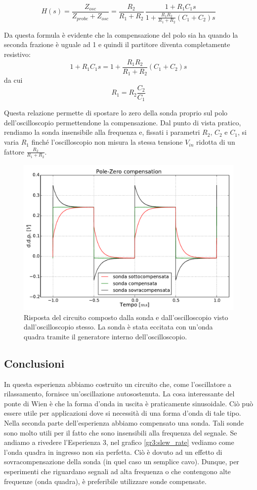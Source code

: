 \begin{equation}
H(s)=\frac{Z_{osc}}{Z_{probe}+Z_{osc}} = \frac{R_2}{R_1+R_2}\,\frac{1+R_1C_1s}{1+\frac{R_1R_2}{R_1+R_2}(C_1+C_2)s}
\end{equation}

Da questa formula è evidente che la compensazione del polo sia ha quando la seconda frazione è uguale ad \num{1} e quindi il partitore diventa completamente resistivo:
\begin{equation*}
1+R_1C_1s = 1+\frac{R_1R_2}{R_1+R_2}(C_1+C_2)s
\end{equation*}
da cui
\begin{equation}
R_1 = R_2 \frac{C_2}{C_1}
\end{equation}

Questa relazione permette di spostare lo zero della sonda proprio sul polo dell'oscilloscopio permettendone la compensazione.
Dal punto di vista pratico, rendiamo la sonda insensibile alla frequenza e, fissati i parametri $R_2$, $C_2$ e $C_1$, si varia $R_1$ finché l'oscilloscopio non misura la stessa tensione $V_{in}$ ridotta di un fattore $\frac{R_2}{R_1+R_2}$.

\begin{figure}[htpc]
\centering
\includegraphics[width=.65\textwidth]{../E08/latex/compensation.pdf}
\caption{Risposta del circuito composto dalla sonda e dall'oscilloscopio visto dall'oscilloscopio stesso. La sonda è stata eccitata con un'onda quadra tramite il generatore interno dell'oscilloscopio.}
\label{fig8:compensation}
\end{figure}

\subsection*{Conclusioni}
In questa esperienza abbiamo costruito un circuito che, come l'oscillatore a rilassamento, fornisce un'oscillazione autosostenuta. La cosa interessante del ponte di Wien è che la forma d'onda in uscita è praticamente sinusoidale. Ciò può essere utile per applicazioni dove si necessità di una forma d'onda di tale tipo. Nella seconda parte dell'esperienza abbiamo compensato una sonda. Tali sonde sono molto utili per il fatto che sono insensibili alla frequenza del segnale. Se andiamo a rivedere l'Esperienza 3, nel grafico \ref{gr3:slew_rate} vediamo come l'onda quadra in ingresso non sia perfetta. Ciò è dovuto ad un effetto di sovracompensazione della sonda (in quel caso un semplice cavo). Dunque, per esperimenti che riguardano segnali ad alta frequenza o che contengono alte frequenze (onda quadra), è preferibile utilizzare sonde compensate.
